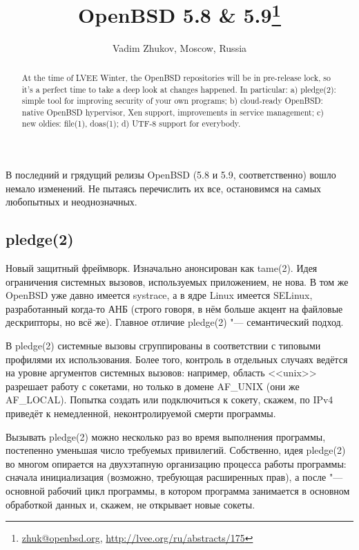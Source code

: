 \documentclass[10pt, a5paper]{article}
\begin{document}
\title{OpenBSD 5.8 \& 5.9\footnote{\url{zhuk@openbsd.org}, \url{http://lvee.org/ru/abstracts/175}}}
\author{Vadim Zhukov, Moscow, Russia}
\maketitle
\begin{abstract}
At the time of LVEE Winter, the OpenBSD repositories will be in pre-release lock, so it's a perfect time to take a deep look at changes happened. In particular: a) pledge(2): simple tool for improving security of your own programs; b) cloud-ready OpenBSD: native OpenBSD hypervisor, Xen support, improvements in service management; c) new oldies: file(1), doas(1); d) UTF-8 support for everybody.
\end{abstract}

В последний и грядущий релизы OpenBSD (5.8 и 5.9, соответственно) вошло немало изменений. Не пытаясь перечислить их все, остановимся на самых любопытных и неоднозначных.

\subsection*{pledge(2)}

Новый защитный фреймворк. Изначально анонсирован как \linebreak tame(2). Идея ограничения системных вызовов, используемых приложением, не нова. В том же OpenBSD уже давно имеется systrace, а в ядре Linux имеется SELinux, разработанный когда-то АНБ (строго говоря, в нём больше акцент на файловые дескрипторы, но всё же). Главное отличие pledge(2) "--- семантический подход.

В pledge(2) системные вызовы сгруппированы в соответствии с типовыми профилями их использования. Более того, контроль в отдельных случаях ведётся на уровне аргументов системных вызовов: например, область <<unix>> разрешает работу с сокетами, но только в домене AF\_UNIX (они же AF\_LOCAL). Попытка создать или подключиться к сокету, скажем, по IPv4 приведёт к немедленной, неконтролируемой смерти программы.

Вызывать pledge(2) можно несколько раз во время выполнения программы, постепенно уменьшая число требуемых привилегий. Собственно, идея pledge(2) во многом опирается на двухэтапную организацию процесса работы программы: сначала инициализация (возможно, требующая расширенных прав), а после "--- основной рабочий цикл программы, в котором программа занимается в основном обработкой данных и, скажем, не открывает новые сокеты.
\end{document}
